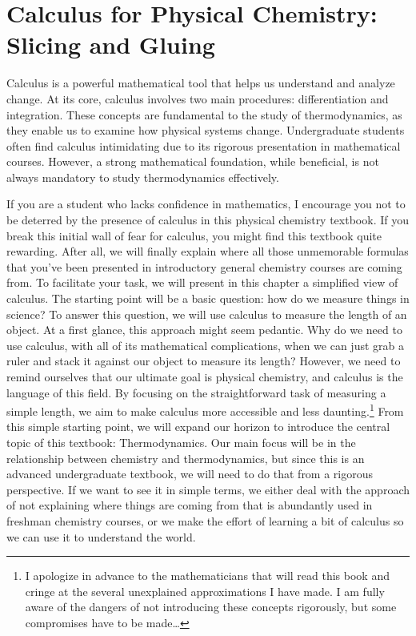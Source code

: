 \documentclass[
  9pt,
]{extbook}
\theoremstyle{definition}
\theoremstyle{definition}
\theoremstyle{definition}
\theoremstyle{definition}
\theoremstyle{remark}
\begin{document}
\section{Calculus for Physical Chemistry: Slicing and Gluing}\label{calculus-for-physical-chemistry-slicing-and-gluing}

Calculus is a powerful mathematical tool that helps us understand and analyze change. At its core, calculus involves two main procedures: differentiation and integration. These concepts are fundamental to the study of thermodynamics, as they enable us to examine how physical systems change. Undergraduate students often find calculus intimidating due to its rigorous presentation in mathematical courses. However, a strong mathematical foundation, while beneficial, is not always mandatory to study thermodynamics effectively.

If you are a student who lacks confidence in mathematics, I encourage you not to be deterred by the presence of calculus in this physical chemistry textbook. If you break this initial wall of fear for calculus, you might find this textbook quite rewarding. After all, we will finally explain where all those unmemorable formulas that you've been presented in introductory general chemistry courses are coming from. To facilitate your task, we will present in this chapter a simplified view of calculus. The starting point will be a basic question: how do we measure things in science? To answer this question, we will use calculus to measure the length of an object. At a first glance, this approach might seem pedantic. Why do we need to use calculus, with all of its mathematical complications, when we can just grab a ruler and stack it against our object to measure its length? However, we need to remind ourselves that our ultimate goal is physical chemistry, and calculus is the language of this field. By focusing on the straightforward task of measuring a simple length, we aim to make calculus more accessible and less daunting.\footnote{I apologize in advance to the mathematicians that will read this book and cringe at the several unexplained approximations I have made. I am fully aware of the dangers of not introducing these concepts rigorously, but some compromises have to be made\ldots{}} From this simple starting point, we will expand our horizon to introduce the central topic of this textbook: Thermodynamics. Our main focus will be in the relationship between chemistry and thermodynamics, but since this is an advanced undergraduate textbook, we will need to do that from a rigorous perspective. If we want to see it in simple terms, we either deal with the approach of not explaining where things are coming from that is abundantly used in freshman chemistry courses, or we make the effort of learning a bit of calculus so we can use it to understand the world.
\end{document}
